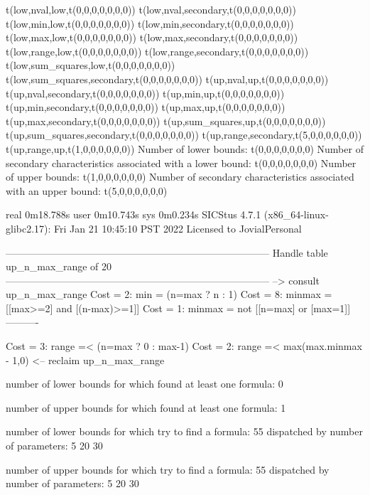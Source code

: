 t(low,nval,low,t(0,0,0,0,0,0,0))
t(low,nval,secondary,t(0,0,0,0,0,0,0))
t(low,min,low,t(0,0,0,0,0,0,0))
t(low,min,secondary,t(0,0,0,0,0,0,0))
t(low,max,low,t(0,0,0,0,0,0,0))
t(low,max,secondary,t(0,0,0,0,0,0,0))
t(low,range,low,t(0,0,0,0,0,0,0))
t(low,range,secondary,t(0,0,0,0,0,0,0))
t(low,sum_squares,low,t(0,0,0,0,0,0,0))
t(low,sum_squares,secondary,t(0,0,0,0,0,0,0))
t(up,nval,up,t(0,0,0,0,0,0,0))
t(up,nval,secondary,t(0,0,0,0,0,0,0))
t(up,min,up,t(0,0,0,0,0,0,0))
t(up,min,secondary,t(0,0,0,0,0,0,0))
t(up,max,up,t(0,0,0,0,0,0,0))
t(up,max,secondary,t(0,0,0,0,0,0,0))
t(up,sum_squares,up,t(0,0,0,0,0,0,0))
t(up,sum_squares,secondary,t(0,0,0,0,0,0,0))
t(up,range,secondary,t(5,0,0,0,0,0,0))
t(up,range,up,t(1,0,0,0,0,0,0))
Number of lower bounds:                                             t(0,0,0,0,0,0,0)
Number of secondary characteristics associated with a lower bound:  t(0,0,0,0,0,0,0)
Number of upper bounds:                                             t(1,0,0,0,0,0,0)
Number of secondary characteristics associated with an upper bound: t(5,0,0,0,0,0,0)

real	0m18.788s
user	0m10.743s
sys	0m0.234s
SICStus 4.7.1 (x86_64-linux-glibc2.17): Fri Jan 21 10:45:10 PST 2022
Licensed to JovialPersonal


--------------------------------------------------------------------------------
Handle table up_n_max_range of 20
--------------------------------------------------------------------------------
--> consult up_n_max_range
Cost =  2:  min    = (n=max ? n : 1)
Cost =  8:  minmax = [[max>=2] and [(n-max)>=1]]
Cost =  1:  minmax = not [[n=max] or [max=1]]
----------

Cost =  3:  range =< (n=max ? 0 : max-1)
Cost =  2:  range =< max(max.minmax - 1,0)
<-- reclaim up_n_max_range

number of lower bounds for which found at least one formula: 0

number of upper bounds for which found at least one formula: 1

number of lower bounds for which try to find a formula: 55
dispatched by number of parameters: 5  20  30

number of upper bounds for which try to find a formula: 55
dispatched by number of parameters: 5  20  30

